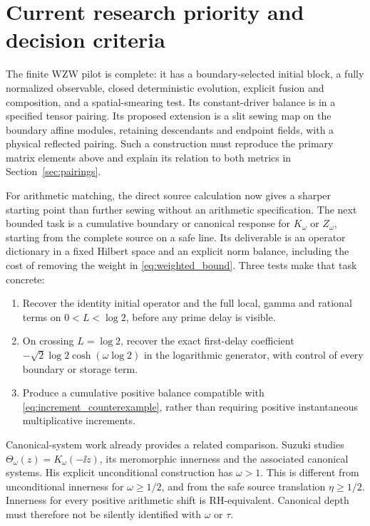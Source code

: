 \section{Current research priority and decision criteria}
\label{sec:outlook}

The finite WZW pilot is complete: it has a boundary-selected initial block,
a fully normalized observable, closed deterministic evolution, explicit
fusion and composition, and a spatial-smearing test. Its constant-driver
balance is in a specified tensor pairing. Its proposed extension is a slit
sewing map on the boundary affine modules, retaining descendants and
endpoint fields, with a physical reflected pairing. Such a construction
must reproduce the primary matrix elements above and explain its relation
to both metrics in Section~\ref{sec:pairings}.

For arithmetic matching, the direct source calculation now gives a sharper
starting point than further sewing without an arithmetic specification.
The next bounded task is a cumulative boundary or canonical response for
$K_\omega$ or $Z_\omega$, starting from the complete source on a safe
line. Its deliverable is an operator dictionary in a fixed Hilbert space
and an explicit norm balance, including the cost of removing the weight
in \eqref{eq:weighted_bound}. Three tests make that task concrete:
\begin{enumerate}
\item Recover the identity initial operator and the full local, gamma and
rational terms on $0<L<\log2$, before any prime delay is visible.
\item On crossing $L=\log2$, recover the exact first-delay coefficient
$-\sqrt2\log2\cosh(\omega\log2)$ in the logarithmic generator,
with control of every boundary or storage term.
\item Produce a cumulative positive balance compatible with
\eqref{eq:increment_counterexample}, rather than requiring positive
instantaneous multiplicative increments.
\end{enumerate}

Canonical-system work already provides a related comparison. Suzuki
\cite{Suzuki} studies
$\Theta_\omega(z)=K_\omega(-\ii z)$, its meromorphic innerness and
the associated canonical systems. His explicit unconditional construction
has $\omega>1$. This is different from unconditional innerness for
$\omega\ge1/2$, and from the safe source translation $\eta\ge1/2$.
Innerness for every positive arithmetic shift is RH-equivalent. Canonical
depth must therefore not be silently identified with $\omega$ or $\tau$.

